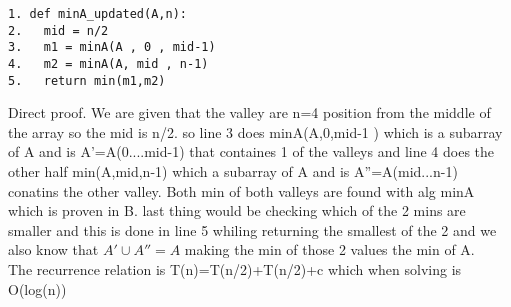 \documentclass[12pt]{article}
\begin{document}
\begin{enumerate}
\begin{enumerate}
	\begin{verbatim}
1. def minA_updated(A,n):
2.   mid = n/2
3.   m1 = minA(A , 0 , mid-1)
4.   m2 = minA(A, mid , n-1)
5.   return min(m1,m2)

	\end{verbatim}

Direct proof. We are given that the valley are n=4 position from the middle of the array so the mid is n/2. so line 3 does minA(A,0,mid-1 ) which is a subarray of A and is A'=A(0....mid-1) that containes 1 of the valleys and line 4 does the other half min(A,mid,n-1) which  a subarray of A and is A''=A(mid...n-1) conatins the other valley. Both min of both valleys are found with alg minA which is proven in B. last thing would be checking which of the 2 mins are smaller and this is done in line 5 whiling returning the smallest of the 2 and we also know that $A' \cup A'' = A$ making the min of those 2 values the min of A.\\

The recurrence relation is T(n)=T(n/2)+T(n/2)+c which when solving is O(log(n))

    \end{enumerate}
\end{enumerate}
\end{document}
